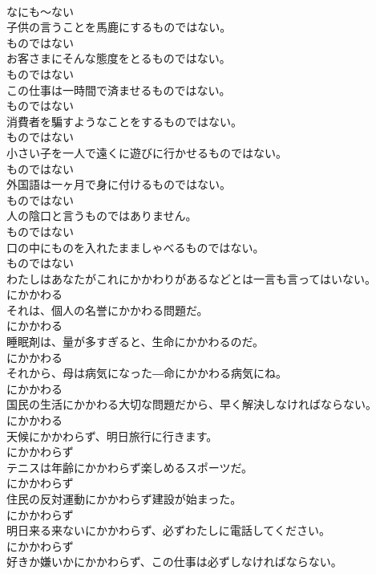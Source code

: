 \documentclass[8pt]{extreport}
\begin{document}
\begin{CJK}{UTF8}{min}
\\	なにも～ない
\\	子供の言うことを馬鹿にするものではない。	
\\	ものではない
\\	お客さまにそんな態度をとるものではない。	
\\	ものではない
\\	この仕事は一時間で済ませるものではない。	
\\	ものではない
\\	消費者を騙すようなことをするものではない。	
\\	ものではない
\\	小さい子を一人で遠くに遊びに行かせるものではない。	
\\	ものではない
\\	外国語は一ヶ月で身に付けるものではない。	
\\	ものではない
\\	人の陰口と言うものではありません。	
\\	ものではない
\\	口の中にものを入れたまましゃべるものではない。	
\\	ものではない
\\	わたしはあなたがこれにかかわりがあるなどとは一言も言ってはいない。	
\\	にかかわる
\\	それは、個人の名誉にかかわる問題だ。	
\\	にかかわる
\\	睡眠剤は、量が多すぎると、生命にかかわるのだ。	
\\	にかかわる
\\	それから、母は病気になった―命にかかわる病気にね。	
\\	にかかわる
\\	国民の生活にかかわる大切な問題だから、早く解決しなければならない。	
\\	にかかわる
\\	天候にかかわらず、明日旅行に行きます。	
\\	にかかわらず
\\	テニスは年齢にかかわらず楽しめるスポーツだ。	
\\	にかかわらず
\\	住民の反対運動にかかわらず建設が始まった。	
\\	にかかわらず
\\	明日来る来ないにかかわらず、必ずわたしに電話してください。	
\\	にかかわらず
\\	好きか嫌いかにかかわらず、この仕事は必ずしなければならない。	

\end{CJK}
\end{document}
